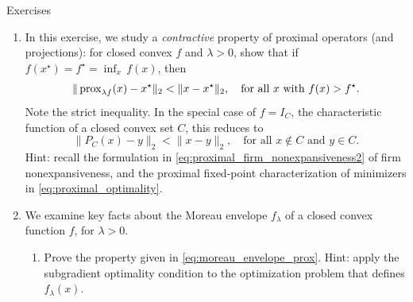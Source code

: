 \begin{xcb}{Exercises}
\begin{enumerate}[label=\thechapter.\arabic*]
\begin{enumerate}[label=\alph*.]
\item Show that the condition from part a is equivalent to firm nonexpansiveness 
  \eqref{eq:projection_firm_nonexpansiveness1}, and show that it also equivalent
  to   
  \[
    (x - y)^\T (r_x - r_y) \geq \|r_x - r_y\|_2^2, \quad \text{for all $x,y$},
  \]
  where we abbreviate $r_x = x - P_C(x)$ and $r_y = x - P_C(y)$.

\item Show using the Cauchy-Schwarz inequality that
  \eqref{eq:projection_firm_nonexpansiveness1} implies
  \eqref{eq:projection_nonexpansiveness}. Show similarly using part b and the
  Cauchy-Schwarz inequality that \eqref{eq:projection_firm_nonexpansiveness1}
  implies \eqref{eq:projection_residual_nonexpansiveness}.

\item Show finally that firm nonexpansiveness is equivalent to  
  \[
  \|p_x - p_y\|_2^2 + \|r_x - r_y\|_2^2 \leq \|x - y\|_2^2, \quad \text{for all
    $x,y$},
  \]
  which gives another way of seeing that
  \eqref{eq:projection_firm_nonexpansiveness1} leads to both
  \eqref{eq:projection_nonexpansiveness} and
  \eqref{eq:projection_residual_nonexpansiveness}. 
\end{enumerate}

\item In this exercise, we study a \emph{contractive} property of proximal
  operators (and projections): for closed convex $f$ and $\lambda > 0$, show
  that if $f(x^\star) = f^\star = \inf_x \, f(x)$, then   
  \[
  \| \operatorname{prox}_{\lambda f}(x) - x^\star\|_2 < \|x - x^\star\|_2, \quad \text{for
    all $x$ with $f(x) > f^\star$}.
  \]
  Note the strict inequality. In the special case of $f = I_C$, the
  characteristic function of a closed convex set $C$, this reduces to 
  \[
  \| P_C(x) - y\|_2 < \|x - y\|_2, \quad \text{for all $x \notin C$ and $y \in
    C$}.    
  \]
  Hint: recall the formulation in \eqref{eq:proximal_firm_nonexpansiveness2} of 
  firm nonexpansiveness, and the proximal fixed-point characterization of
  minimizers in \eqref{eq:proximal_optimality}.     

\item \label{ex:moreau_envelope}
  We examine key facts about the Moreau envelope $f_\lambda$ of a closed convex
  function $f$, for $\lambda > 0$. 

\begin{enumerate}[label=\alph*.]
\item Prove the property given in \eqref{eq:moreau_envelope_prox}. Hint: apply
  the subgradient optimality condition to the optimization problem that defines 
  $f_\lambda(x)$.     
 

\end{enumerate}
\end{enumerate}
\end{xcb}
